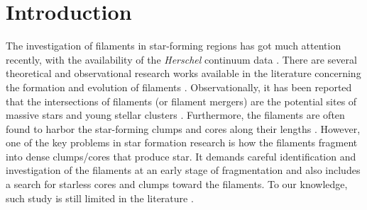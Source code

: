 \documentclass[iop]{emulateapj}
\begin{document}
\section{Introduction}
\label{sec:intro}
%
The investigation of filaments in star-forming regions has got much attention recently, with the availability of the {\it Herschel} continuum data \citep[e.g.,][and references therein]{andre10,andre16,li16,kainulainen16,kainulainen17}. 
There are several theoretical and observational research works available in the literature 
concerning the formation and evolution of filaments \citep[e.g.][and references therein]{ostriker64,inutsuka97,andre10,andre16,li16,kainulainen16,kainulainen17}.
Observationally, it has been reported that the intersections of filaments (or filament mergers) are the potential sites of massive stars and young stellar clusters \citep{schneider12,peretto13,myers09}. 
Furthermore, the filaments are often found to harbor the star-forming clumps and cores along their lengths \citep[e.g.][and references therein]{schneider12,ragan14,contreras16,li16}. 
However, one of the key problems in star formation research is how the filaments fragment into dense clumps/cores that produce star.
It demands careful identification and investigation of the filaments at an early stage of fragmentation and also includes 
a search for starless cores and clumps toward the filaments. 
To our knowledge, such study is still limited in the literature \citep[e.g.,][]{kainulainen16}. 
\end{document}
